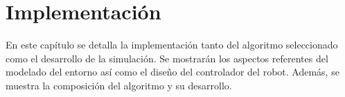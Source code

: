 \chapter{Implementación}
\label{implementacion}

En este capítulo se detalla la implementación tanto del algoritmo seleccionado como el desarrollo de la simulación. Se mostrarán los aspectos referentes del modelado del entorno así como el diseño del controlador del robot. Además, se muestra la composición del algoritmo y su desarrollo.



